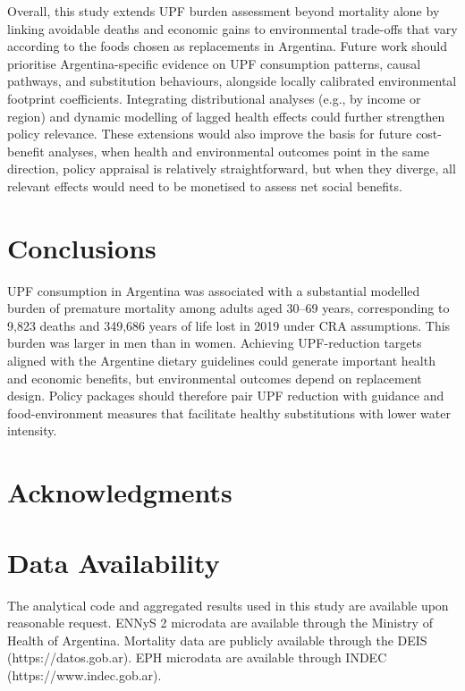 \documentclass{article}
\begin{document}
Overall, this study extends UPF burden assessment beyond mortality alone by linking avoidable deaths and economic gains to environmental trade-offs that vary according to the foods chosen as replacements in Argentina. Future work should prioritise Argentina-specific evidence on UPF consumption patterns, causal pathways, and substitution behaviours, alongside locally calibrated environmental footprint coefficients. Integrating distributional analyses (e.g., by income or region) and dynamic modelling of lagged health effects could further strengthen policy relevance. These extensions would also improve the basis for future cost-benefit analyses, when health and environmental outcomes point in the same direction, policy appraisal is relatively straightforward, but when they diverge, all relevant effects would need to be monetised to assess net social benefits.

\section{Conclusions}\label{conclusions}

UPF consumption in Argentina was associated with a substantial modelled burden of premature mortality among adults aged 30--69 years, corresponding to 9,823 deaths and 349,686 years of life lost in 2019 under CRA assumptions. This burden was larger in men than in women. Achieving UPF-reduction targets aligned with the Argentine dietary guidelines could generate important health and economic benefits, but environmental outcomes depend on replacement design. Policy packages should therefore pair UPF reduction with guidance and food-environment measures that facilitate healthy substitutions with lower water intensity.


\section*{Acknowledgments}\label{acknowledgments}

\section*{Data Availability}\label{data-availability}

The analytical code and aggregated results used in this study are
available upon reasonable request. ENNyS 2 microdata are available
through the Ministry of Health of Argentina. Mortality data are publicly
available through the DEIS (https://datos.gob.ar). EPH microdata are
available through INDEC (https://www.indec.gob.ar).
\end{document}
